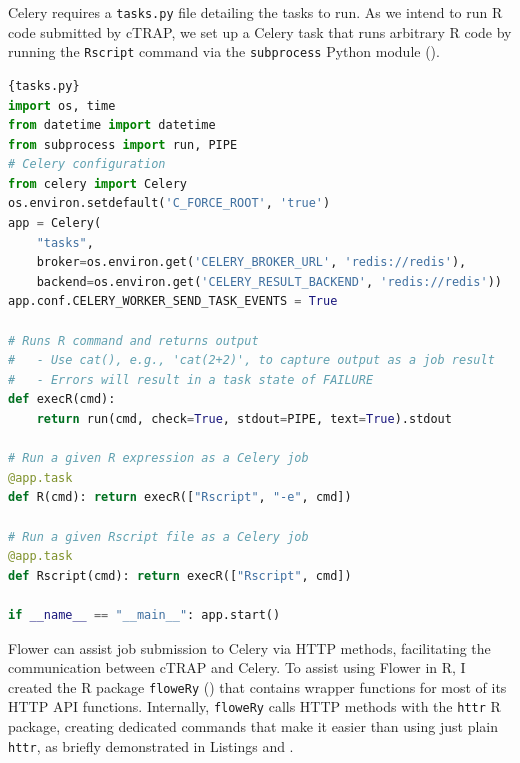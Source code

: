 Celery requires a \texttt{tasks.py} file detailing the tasks to run. As we intend to run R code submitted by cTRAP, we set up a Celery task that runs arbitrary R code by running the \texttt{Rscript} command via the \texttt{subprocess} Python module ().

\begin{lstlisting}[language=python,caption=An example \texttt{tasks.py} file to run R commands or Rscript files via Celery.,label={lst:tasks.py},morekeywords={import},keywordstyle=\bfseries]{tasks.py}
import os, time
from datetime import datetime
from subprocess import run, PIPE
# Celery configuration
from celery import Celery
os.environ.setdefault('C_FORCE_ROOT', 'true')
app = Celery(
    "tasks",
    broker=os.environ.get('CELERY_BROKER_URL', 'redis://redis'),
    backend=os.environ.get('CELERY_RESULT_BACKEND', 'redis://redis'))
app.conf.CELERY_WORKER_SEND_TASK_EVENTS = True

# Runs R command and returns output
#   - Use cat(), e.g., 'cat(2+2)', to capture output as a job result
#   - Errors will result in a task state of FAILURE
def execR(cmd):
    return run(cmd, check=True, stdout=PIPE, text=True).stdout

# Run a given R expression as a Celery job
@app.task
def R(cmd): return execR(["Rscript", "-e", cmd])

# Run a given Rscript file as a Celery job
@app.task
def Rscript(cmd): return execR(["Rscript", cmd])

if __name__ == "__main__": app.start()
\end{lstlisting}

Flower can assist job submission to Celery via HTTP methods, facilitating the communication between cTRAP and Celery. To assist using Flower in R, I created the R package \texttt{floweRy} () that contains wrapper functions for most of its HTTP API functions. Internally, \texttt{floweRy} calls HTTP methods with the \texttt{httr} R package, creating dedicated commands that make it easier than using just plain \texttt{httr}, as briefly demonstrated in Listings  and .

